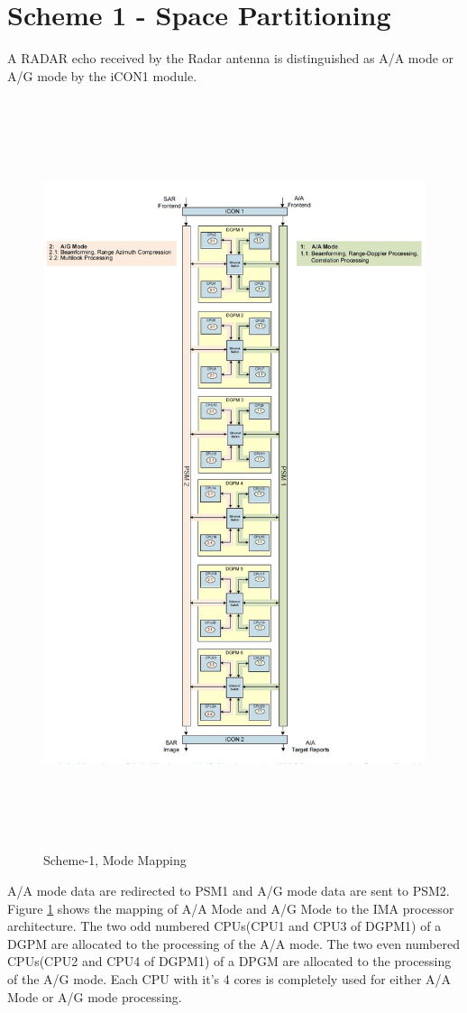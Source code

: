 \section{Scheme 1 - Space Partitioning}
\label{sec:scheme_1}
A RADAR echo received by the Radar antenna is distinguished as A/A mode or A/G mode by the iCON1 module. 
\begin{figure}[h!]
	\centering
	\includegraphics[width=160mm, height=220mm]{figures/scheme1}
	\caption{ Scheme-1, Mode Mapping}
	\label{fig:existing_analysis:scheme1}
\end{figure}
\FloatBarrier
A/A mode data are redirected to PSM1 and A/G mode data are sent to PSM2. Figure \ref{fig:existing_analysis:scheme1} shows the mapping of A/A Mode and A/G Mode to the IMA processor architecture. The two odd numbered CPUs(CPU1 and CPU3 of DGPM1) of a  DGPM are allocated to the processing of the A/A mode. The two even numbered CPUs(CPU2 and CPU4 of DGPM1)  of a DPGM are allocated to the processing of the A/G mode. Each CPU with it's 4 cores is completely used for either A/A Mode or A/G mode processing.


